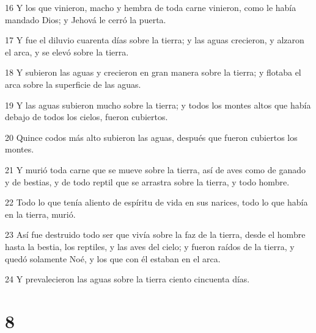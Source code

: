 \par 16 Y los que vinieron, macho y hembra de toda carne vinieron, como le había mandado Dios; y Jehová le cerró la puerta.
\par 17 Y fue el diluvio cuarenta días sobre la tierra; y las aguas crecieron, y alzaron el arca, y se elevó sobre la tierra.
\par 18 Y subieron las aguas y crecieron en gran manera sobre la tierra; y flotaba el arca sobre la superficie de las aguas.
\par 19 Y las aguas subieron mucho sobre la tierra; y todos los montes altos que había debajo de todos los cielos, fueron cubiertos.
\par 20 Quince codos más alto subieron las aguas, después que fueron cubiertos los montes.
\par 21 Y murió toda carne que se mueve sobre la tierra, así de aves como de ganado y de bestias, y de todo reptil que se arrastra sobre la tierra, y todo hombre.
\par 22 Todo lo que tenía aliento de espíritu de vida en sus narices, todo lo que había en la tierra, murió.
\par 23 Así fue destruido todo ser que vivía sobre la faz de la tierra, desde el hombre hasta la bestia, los reptiles, y las aves del cielo; y fueron raídos de la tierra, y quedó solamente Noé, y los que con él estaban en el arca.
\par 24 Y prevalecieron las aguas sobre la tierra ciento cincuenta días.

\chapter{8}

